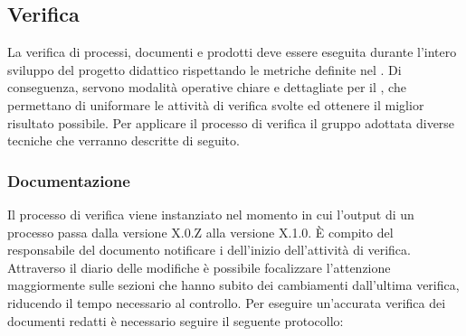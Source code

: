 \documentclass[12pt,a4paper]{article}
\begin{document}

\subsection{Verifica}

La verifica di processi, documenti e prodotti deve essere eseguita durante l'intero sviluppo del progetto didattico rispettando le metriche definite nel \PdQ{}. Di conseguenza, servono modalità operative chiare e dettagliate per il \VR, che permettano di uniformare le attività di verifica svolte ed ottenere il miglior risultato possibile. Per applicare il processo di verifica il gruppo adottata diverse tecniche che verranno descritte di seguito.

\subsubsection{Documentazione}
Il processo di verifica viene instanziato nel momento in cui l'output di un processo passa dalla versione X.0.Z alla versione X.1.0. È compito del responsabile del documento notificare i \VRpl{} dell'inizio dell'attività di verifica. Attraverso il diario delle modifiche è possibile focalizzare l'attenzione maggiormente sulle sezioni che hanno subito dei cambiamenti dall'ultima verifica, riducendo il tempo necessario al controllo. Per eseguire un'accurata verifica dei documenti redatti è necessario seguire il seguente protocollo:
\end{document}
